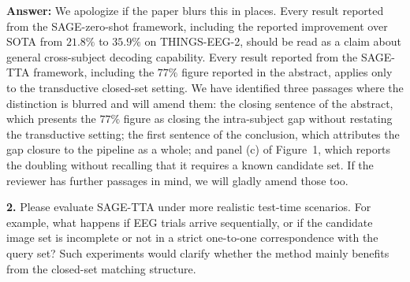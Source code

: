 \documentclass[11pt]{article}
\newcommand{\answer}[1]{{\textbf{Answer:} \color{blue} #1}}
\begin{document}
\answer{
We apologize if the paper blurs this in places.
Every result reported from the SAGE-zero-shot framework, including the reported improvement over SOTA from $21.8\%$ to $35.9\%$ on THINGS-EEG-2, should be read as a claim about general cross-subject decoding capability. Every result reported from the SAGE-TTA framework, including the $77\%$ figure reported in the abstract, applies only to the transductive closed-set setting. We have identified three passages where the distinction is blurred and will amend them: the closing sentence of the abstract, which presents the $77\%$ figure as closing the intra-subject gap without restating the transductive setting; the first sentence of the conclusion, which attributes the gap closure to the pipeline as a whole; and panel (c) of Figure~1, which reports the doubling without recalling that it requires a known candidate set. If the reviewer has further passages in mind, we will gladly amend those too.
}

\textbf{2.} Please evaluate SAGE-TTA under more realistic test-time scenarios. For example, what
happens if EEG trials arrive sequentially, or if the candidate image set is incomplete or not in a
strict one-to-one correspondence with the query set? Such experiments would clarify whether the method
mainly benefits from the closed-set matching structure.
\end{document}
